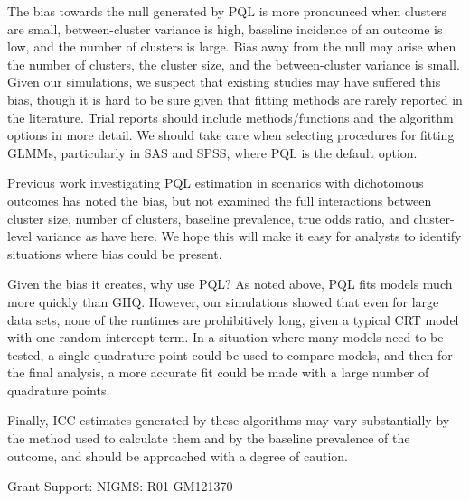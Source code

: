 \documentclass[Afour,times,sagev,doublespace]{sagej}
\begin{document}
The bias towards the null generated by PQL is more pronounced when clusters are small, between-cluster variance is high, baseline incidence of an outcome is low, and the number of clusters is large. Bias away from the null may arise when the number of clusters, the cluster size, and the between-cluster variance is small. Given our simulations, we suspect that existing studies may have suffered this bias, though it is hard to be sure given that fitting methods are rarely reported in the literature. Trial reports should include methods/functions and the algorithm options in more detail.  We should take care when selecting procedures for fitting GLMMs, particularly in SAS and SPSS, where PQL is the default option.

Previous work investigating PQL estimation in scenarios with dichotomous outcomes has noted the bias\cite{jang_numerical_2009,zhang_fitting_2011}, but not examined the full interactions between cluster size, number of clusters, baseline prevalence, true odds ratio, and cluster-level variance as have here. We hope this will make it easy for analysts to identify situations where bias could be present.

Given the bias it creates, why use PQL? As noted above, PQL fits models much more quickly than GHQ. However, our simulations showed that even for large data sets, none of the runtimes are prohibitively long, given a typical CRT model with one random intercept term. In a situation where many models need to be tested, a single quadrature point could be used to compare models, and then for the final analysis, a more accurate fit could be made with a large number of quadrature points.

Finally, ICC estimates generated by these algorithms may vary substantially by the method used to calculate them and by the baseline prevalence of the outcome, and should be approached with a degree of caution.







\begin{funding}
Grant Support: NIGMS: R01 GM121370
\end{funding}
\end{document}
